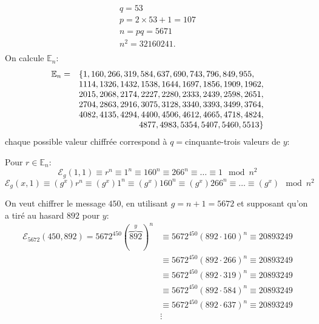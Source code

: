 		\begin{equation*}
			\begin{array}{l}
				q = 53	\\
				p = 2\times 53 +1 = 107 \\
				n = pq = 5671\\
				n^2 = 32160241.\\
			\end{array}
		\end{equation*}
		On calcule $\mathbb{E}_n$:
		\begin{equation*}
			\begin{array}[t]{ll} 
				\mathbb{E}_n = &\{1, 160, 266, 319, 584, 637, 690, 743, 796, 849, 955, \\
				&1114, 1326, 1432, 1538, 1644, 1697, 1856, 1909, 1962, \\
				&2015, 2068, 2174, 2227, 2280, 2333, 2439, 2598, 2651, \\
				&2704, 2863, 2916, 3075, 3128, 3340, 3393, 3499, 3764, \\
				&4082, 4135, 4294, 4400, 4506, 4612, 4665, 4718, 4824,\\
				&\multicolumn{1}{r}{4877, 4983, 5354, 5407, 5460, 5513\}}
			\end{array}
		\end{equation*}
		chaque possible valeur chiffrée correspond à $q = $cinquante-trois valeurs de $y$:


		Pour $r\in\mathbb{E}_n$:
			$${\mathcal{E}}_g(1,1) \equiv r^n \equiv 1^{n} \equiv 160^{n} \equiv 266^{n} \equiv \dots \equiv 1 \mod{n^2}$$
			$${\mathcal{E}}_g(x,1) \equiv (g^x)r^n \equiv (g^x)1^{n} \equiv (g^x)160^{n} \equiv (g^x)266^{n} \equiv \dots \equiv (g^x) \mod{n^2}$$

			On veut chiffrer le message $450$, en utilisant $g = n+1 = 5672$ et supposant qu'on a tiré au hasard 
			$892$ pour $y$:
			\begin{align*}
				{\mathcal{E}}_{5672}(450,892)= 5672^{450}(\overset{y}{\overbrace{892}})^n &\equiv 5672^{450}(892\cdot160)^n \equiv 20893249\\
						  &\equiv 5672^{450}(892\cdot266)^n \equiv 20893249\\
						  &\equiv 5672^{450}(892\cdot319)^n \equiv 20893249\\
						  &\equiv 5672^{450}(892\cdot584)^n \equiv 20893249\\
						  &\equiv 5672^{450}(892\cdot637)^n \equiv 20893249\\
						  & \vdots
			\end{align*}

